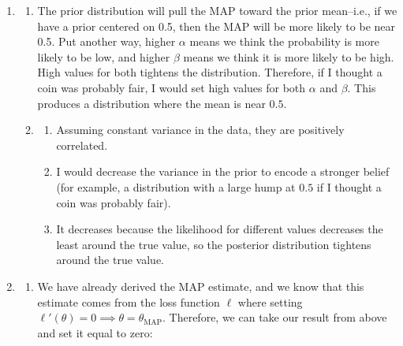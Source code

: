 \documentclass[submit]{harvardml}
\newenvironment{ans}{
  \begin{enumerate}
  \color{blue}
}{
  \end{enumerate}
  \color{black}
}
\DeclareMathOperator*{\mean}{\mathbb{E}}
\begin{document}
\begin{ans}
\begin{enumerate}
        \begin{enumerate}
            \item $\mean \theta_\text{post} = \frac{y + \alpha}{y + \alpha + \beta + N - y}$
            \item $\theta_{\text{MAP}} = \frac{y + \alpha - 1}{n + \alpha + \beta - 2}$
            \item If we let $\mu$ be the result in i), then $\text{Var}(\theta | Y = y) = \frac{\mu(1 - \mu)}{y + \alpha + \beta + N - y + 1}$
        \end{enumerate}
    \end{enumerate}
    \item 
    \begin{enumerate}
        \item The prior distribution will pull the MAP toward the prior mean--i.e., if we have a prior centered on 0.5, then the MAP will be more likely to be near 0.5. Put another way, higher $\alpha$ means we think the probability is more likely to be low, and higher $\beta$ means we think it is more likely to be high. High values for both tightens the distribution. Therefore, if I thought a coin was probably fair, I would set high values for both $\alpha$ and $\beta$. This produces a distribution where the mean is near $0.5$. 
        \item 
        \begin{enumerate}
            \item Assuming constant variance in the data, they are positively correlated. 
            \item I would decrease the variance in the prior to encode a stronger belief (for example, a distribution with a large hump at $0.5$ if I thought a coin was probably fair). 
            \item It decreases because the likelihood for different values decreases the least around the true value, so the posterior distribution tightens around the true value. 
        \end{enumerate}
    \end{enumerate}
    \item 
    \begin{enumerate}
        \item 
    We have already derived the MAP estimate, and we know that this estimate comes from the loss function $\ell$ where setting $\ell'(\theta) = 0 \implies \theta = \theta_{\text{MAP}}$. Therefore, we can take our result from above and set it equal to zero:

\end{enumerate}
\end{ans}
\end{document}
